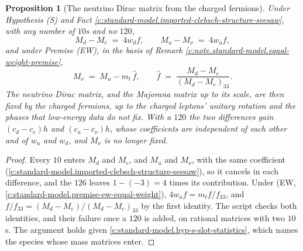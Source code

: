 \documentclass[11pt]{article}
\newtheorem{proposition}[theorem]{Proposition}
\theoremstyle{definition}
\theoremstyle{plain}
\newcommand{\changedmark}[2]{\marginpar{\raggedright\scriptsize\color{#1}#2}}
\begin{document}
\begin{proposition}[The neutrino Dirac matrix from the charged fermions]\label{c:standard-model.neutrino-dirac-matrix-charged-fermions}
\changedmark{gray}{reworded}
Under Hypothesis (S) and Fact \ref{c:standard-model.imported-clebsch-structure-seesaw}, with any number of $10$s and no $120$,
\[
M_{d} - M_{e} \;=\; 4w_{d}f, \qquad M_{u} - M_{\nu} \;=\; 4w_{u}f,
\]
and under Premise (EW), in the basis of Remark \ref{c:note.standard-model.equal-weight-premise},
\[
M_{\nu} \;=\; M_{u} - m_{t}\,\hat{f}, \qquad \hat{f} \;=\; \frac{M_{d} - M_{e}}{(M_{d} - M_{e})_{33}}.
\]
The neutrino Dirac matrix, and the Majorana matrix up to its scale, are then fixed by the charged fermions, up to the charged leptons' unitary rotation and the phases that low-energy data do not fix. With a $120$ the two differences gain $(c_{d} - c_{e})h$ and $(c_{u} - c_{\nu})h$, whose coefficients are independent of each other and of $w_{u}$ and $w_{d}$, and $M_{\nu}$ is no longer fixed.
\end{proposition}
\begin{proof}
Every $10$ enters $M_{d}$ and $M_{e}$, and $M_{u}$ and $M_{\nu}$, with the same coefficient (\ref{c:standard-model.imported-clebsch-structure-seesaw}), so it cancels in each difference, and the $126$ leaves $1 - (-3) = 4$ times its contribution. Under (EW, \ref{c:standard-model.premise-ew-equal-weight}), $4w_{u}f = m_{t}f/f_{33}$, and $f/f_{33} = (M_{d} - M_{e})/(M_{d} - M_{e})_{33}$ by the first identity. The script checks both identities, and their failure once a $120$ is added, on rational matrices with two $10$s. The argument holds given \ref{c:standard-model.hyp-s-slot-statistics}, which names the species whose mass matrices enter.

\end{proof}
\end{document}
